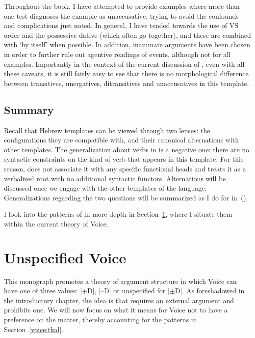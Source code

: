 Throughout the book, I have attempted to provide examples where more than one test diagnoses the example as unaccusative, trying to avoid the confounds and complications just noted. In general, I have tended towards the use of VS order and the possessive dative (which often go together), and these are combined with `by itself' when possible. In addition, inanimate arguments have been chosen in order to further rule out agentive readings of events, although not for all examples. Importantly in the context of the current discussion of {\tkal}, even with all these caveats, it is still fairly easy to see that there is no morphological difference between transitives, unergatives, ditransitives and unaccusatives in this template.


	\subsection{Summary}

Recall that Hebrew templates can be viewed through two lenses: the configurations they are compatible with, and their canonical alternations with other templates. The generalization about verbs in {\tkal} is a negative one: there are no syntactic constraints on the kind of verb that appears in this template. For this reason, \cite{doron03} does not associate it with any specific functional heads and \cite{borer13oup,borer15roots} treats it as a verbalized root with no additional syntactic functors. Alternations will be discussed once we engage with the other templates of the language. Generalizations regarding the two questions will be summarized as I do for {\tkal} in~(\nextx).


I look into the patterns of {\tkal} in more depth in Section~\ref{voice:voice}, where I situate them within the current theory of Voice.

\section{Unspecified Voice} \label{voice:voice}
This monograph promotes a theory of argument structure in which Voice can have one of three values: [\!+\!D], [--D] or unspecified for [$\pm$D]. As foreshadowed in the introductory chapter, the idea is that {\vd} requires an external argument and {\vz} prohibits one. We will now focus on what it means for Voice not to have a preference on the matter, thereby accounting for the patterns in Section~\ref{voice:tkal}.

